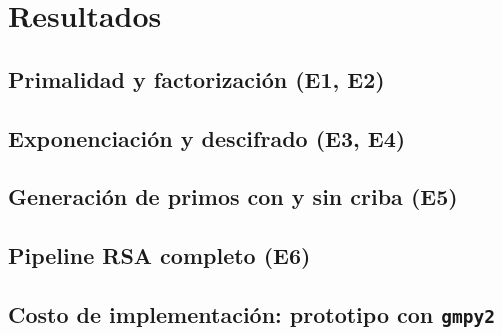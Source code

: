 \section{Resultados}
\label{sec:resultados}

\subsection{Primalidad y factorización (E1, E2)}

\subsection{Exponenciación y descifrado (E3, E4)}

\subsection{Generación de primos con y sin criba (E5)}

\subsection{Pipeline RSA completo (E6)}

\subsection{Costo de implementación: prototipo con \texttt{gmpy2}}
